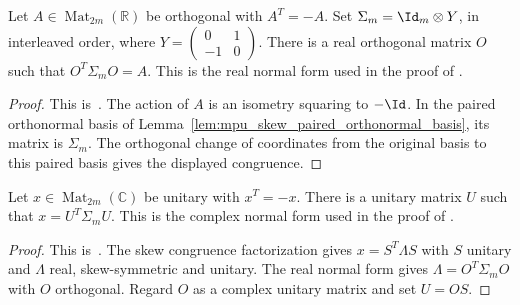 \begin{lemma}
    \label{thm:mpu_real_skew_orthogonal_normal_form}
    \leanok
    Let $A\in\operatorname{Mat}_{2m}(\mathbb R)$ be orthogonal with
    $A^T=-A$. Set $\Sigma_m=\Id_m\otimes Y$, in interleaved order, where
    $Y=\left(\begin{smallmatrix}0&1\\-1&0\end{smallmatrix}\right)$.
    There is a real orthogonal matrix $O$ such that
    $O^T\Sigma_m O=A$.
    This is the real normal form used in the proof of
    \cite[Proposition~V.2]{Cirac2017MPU}.
\end{lemma}
\begin{proof}\leanok
    This is~\cite[``Real skew-orthogonal normal form'']{QICLean2026Blueprint}.
    The action of $A$ is an isometry squaring to $-\Id$. In the paired
    orthonormal basis of Lemma~\ref{lem:mpu_skew_paired_orthonormal_basis},
    its matrix is $\Sigma_m$. The orthogonal change of coordinates from
    the original basis to this paired basis gives the displayed congruence.
\end{proof}

\begin{lemma}
    \label{thm:mpu_complex_skew_unitary_normal_form}
    \leanok
    Let $x\in\operatorname{Mat}_{2m}(\mathbb C)$ be unitary with $x^T=-x$.
    There is a unitary matrix $U$ such that $x=U^T\Sigma_m U$.
    This is the complex normal form used in the proof of
    \cite[Proposition~V.2]{Cirac2017MPU}.
\end{lemma}
\begin{proof}\leanok
    This is~\cite[``Complex skew-unitary normal form'']{QICLean2026Blueprint}.
    The skew congruence factorization gives $x=S^T\Lambda S$ with $S$
    unitary and $\Lambda$ real, skew-symmetric and unitary.
    The real normal form gives $\Lambda=O^T\Sigma_m O$ with $O$ orthogonal.
    Regard $O$ as a complex unitary matrix and set $U=OS$.
\end{proof}

